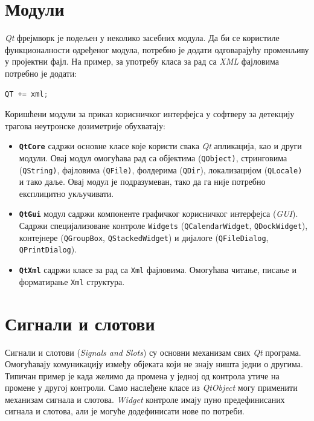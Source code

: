 \documentclass[11pt,a4paper,serbian,oneside]{book}
\begin{document}
\section{Модули}

\textit{Qt} фрејмворк је подељен у неколико засебних модула. Да би се користиле функционалности одређеног модула, потребно је додати одговарајућу променљиву у пројектни фајл. На пример, за употребу класа за рад са \textit{XML} фајловима потребно је додати:
\begin{lstlisting}[language=C++,label=lst:pro,caption=Укључивање модула за рад са \textit{XML} фајловима]
QT += xml;
\end{lstlisting}

Коришћени модули за приказ корисничког интерфејса у софтверу за детекцију трагова неутронске дозиметрије обухватају:
\begin{itemize}

  \item \textbf{\texttt{QtCore}} садржи основне класе које користи свака \textit{Qt} апликација, као и други модули. Овај модул омогућава рад са објектима (\texttt{QObject)}, стринговима (\texttt{QString)}, фајловима (\texttt{QFile)}, фолдерима (\texttt{QDir}), локализацијом (\texttt{QLocаle)} и тако даље. Овај модул је подразумеван, тако да га није потребно експлицитно укључивати.

  \item \textbf{\texttt{QtGui}} модул садржи компоненте графичког корисничког интерфејса (\textit{GUI}). Садржи специјализоване контроле \texttt{Widgets} (\texttt{QCalendarWidget}, \texttt{QDockWidget}), контејнере (\texttt{QGroupBox}, \texttt{QStackedWidget}) и дијалоге (\texttt{QFileDialog}, \texttt{QPrintDialog}).

  \item \textbf{\texttt{QtXml}} садржи класе за рад са \texttt{Xml} фајловима. Омогућава читање, писање и форматирање \texttt{Xml} структура.

\end{itemize}

\section{Сигнали и слотови}

Сигнали и слотови (\textit{Signals and Slots}) су основни механизам свих \textit{Qt} програма. Омогућавају комуникацију између објеката који не знају ништа једни о другима. Типичан пример је када желимо да промена у једној од контрола утиче на промене у другој контроли. Само наслеђене класе из \textit{QtObject} могу применити механизам сигнала и слотова. \textit{Widget} контроле имају пуно предефинисаних сигнала и слотова, али је могуће додефинисати нове по потреби.
\end{document}

